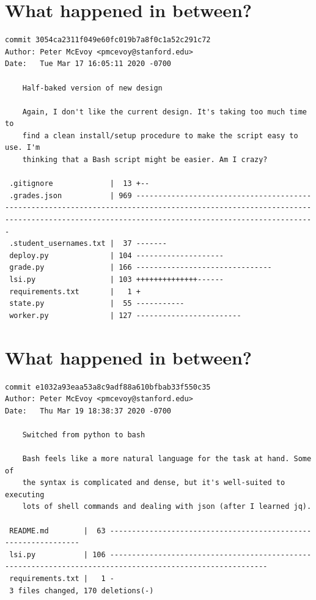 \documentclass{article}
\begin{document}
\newpage

\section*{What happened in between?}
\vspace{2ex}
\begin{verbatim}
commit 3054ca2311f049e60fc019b7a8f0c1a52c291c72
Author: Peter McEvoy <pmcevoy@stanford.edu>
Date:   Tue Mar 17 16:05:11 2020 -0700

    Half-baked version of new design
    
    Again, I don't like the current design. It's taking too much time to
    find a clean install/setup procedure to make the script easy to use. I'm
    thinking that a Bash script might be easier. Am I crazy?

 .gitignore             |  13 +--
 .grades.json           | 969 -------------------------------------------------------------------------------------------------------------------------------------------------------------------------------------
 .student_usernames.txt |  37 -------
 deploy.py              | 104 --------------------
 grade.py               | 166 -------------------------------
 lsi.py                 | 103 ++++++++++++++------
 requirements.txt       |   1 +
 state.py               |  55 -----------
 worker.py              | 127 ------------------------

\end{verbatim}

\newpage

\section*{What happened in between?}
\vspace{2ex}
\begin{verbatim}
commit e1032a93eaa53a8c9adf88a610bfbab33f550c35
Author: Peter McEvoy <pmcevoy@stanford.edu>
Date:   Thu Mar 19 18:38:37 2020 -0700

    Switched from python to bash
    
    Bash feels like a more natural language for the task at hand. Some of
    the syntax is complicated and dense, but it's well-suited to executing
    lots of shell commands and dealing with json (after I learned jq).

 README.md        |  63 ---------------------------------------------------------------
 lsi.py           | 106 ----------------------------------------------------------------------------------------------------------
 requirements.txt |   1 -
 3 files changed, 170 deletions(-)

\end{verbatim}
\end{document}
